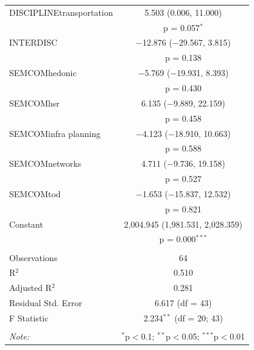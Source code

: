 \begin{table}
\begin{tabular}{@{\extracolsep{5pt}}lc}
  DISCIPLINEtransportation & 5.503 (0.006, 11.000) \\ 
  & p = 0.057$^{*}$ \\ 
  INTERDISC & $-$12.876 ($-$29.567, 3.815) \\ 
  & p = 0.138 \\ 
  SEMCOMhedonic & $-$5.769 ($-$19.931, 8.393) \\ 
  & p = 0.430 \\ 
  SEMCOMhsr & 6.135 ($-$9.889, 22.159) \\ 
  & p = 0.458 \\ 
  SEMCOMinfra planning & $-$4.123 ($-$18.910, 10.663) \\ 
  & p = 0.588 \\ 
  SEMCOMnetworks & 4.711 ($-$9.736, 19.158) \\ 
  & p = 0.527 \\ 
  SEMCOMtod & $-$1.653 ($-$15.837, 12.532) \\ 
  & p = 0.821 \\ 
  Constant & 2,004.945 (1,981.531, 2,028.359) \\ 
  & p = 0.000$^{***}$ \\ 
 \hline \\[-1.8ex] 
Observations & 64 \\ 
R$^{2}$ & 0.510 \\ 
Adjusted R$^{2}$ & 0.281 \\ 
Residual Std. Error & 6.617 (df = 43) \\ 
F Statistic & 2.234$^{**}$ (df = 20; 43) \\ 
\hline 
\hline \\[-1.8ex] 
\textit{Note:}  & \multicolumn{1}{r}{$^{*}$p$<$0.1; $^{**}$p$<$0.05; $^{***}$p$<$0.01} \\ 
\end{tabular} 
\end{table} 









